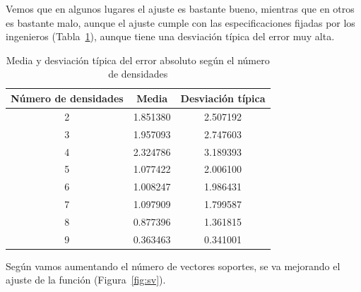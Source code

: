 \documentclass[12pt,a4paper,twoside,openright,titlepage,final]{article}
\begin{document}
Vemos que en algunos lugares el ajuste es bastante bueno, mientras que en otros es bastante malo, aunque el ajuste cumple con las especificaciones fijadas por los ingenieros (Tabla~\ref{tbl:medias}), aunque tiene una desviación típica del error muy alta.\\

\begin{table}[htbp!]
\centering
\caption{Media y desviación típica del error absoluto según el número de densidades}
\label{tbl:medias}
\begin{tabular}{@{}ccc@{}}
\toprule
Número de densidades & Media     & Desviación típica \\ \midrule
2                    & 1.851380  & 2.507192          \\
3                    & 1.957093  & 2.747603          \\
4                    & 2.324786  & 3.189393          \\
5                    & 1.077422  & 2.006100          \\
6                    & 1.008247  & 1.986431          \\
7                    & 1.097909  & 1.799587          \\
8                    & 0.877396  & 1.361815          \\
9                    & 0.363463  & 0.341001         \\ \bottomrule
\end{tabular}
\end{table}

Según vamos aumentando el número de vectores soportes, se va mejorando el ajuste de la función (Figura~\ref{fig:sv}).\\
\end{document}
